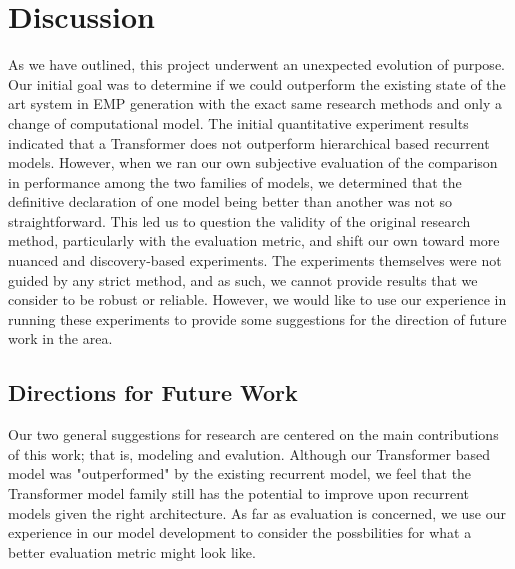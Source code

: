 \chapter{Discussion} \label{ch:ch7}
As we have outlined, this project underwent an unexpected evolution of purpose. Our initial goal was to determine if we could outperform the existing state of the art system in EMP generation with the exact same research methods and only a change of computational model. The initial quantitative experiment results indicated that a Transformer does not outperform hierarchical based recurrent models. However, when we ran our own subjective evaluation of the comparison in performance among the two families of models, we determined that the definitive declaration of one model being better than another was not so straightforward. This led us to question the validity of the original research method, particularly with the evaluation metric, and shift our own toward more nuanced and discovery-based experiments. The experiments themselves were not guided by any strict method, and as such, we cannot provide results that we consider to be robust or reliable. However, we would like to use our experience in running these experiments to provide some suggestions for the direction of future work in the area. 

\section{Directions for Future Work}
Our two general suggestions for research are centered on the main contributions of this work; that is, modeling and evalution. Although our Transformer based model was "outperformed" by the existing recurrent model, we feel that the Transformer model family still has the potential to improve upon recurrent models given the right architecture. As far as evaluation is concerned, we use our experience in our model development to consider the possbilities for what a better evaluation metric might look like. 


